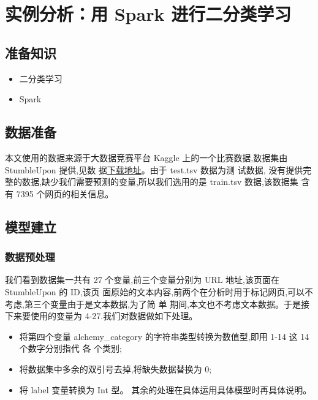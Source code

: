 \section{实例分析：用 Spark
进行二分类学习}\label{ux5b9eux4f8bux5206ux6790ux7528-spark-ux8fdbux884cux4e8cux5206ux7c7bux5b66ux4e60}

\subsection{准备知识}\label{ux51c6ux5907ux77e5ux8bc6}

\begin{itemize}
\itemsep1pt\parskip0pt
\item
  二分类学习
\item
  Spark
\end{itemize}

\subsection{数据准备}\label{ux6570ux636eux51c6ux5907}

本文使用的数据来源于大数据竞赛平台 Kaggle 上的一个比赛数据,数据集由
StumbleUpon 提供,见数
据\href{https://www.kaggle.com/c/stumbleupon/data?train.tsv}{下载地址}。由于
test.tsv 数据为测 试数据,
没有提供完整的数据,缺少我们需要预测的变量,所以我们选用的是 train.tsv
数据,该数据集 含有 7395 个网页的相关信息。

\subsection{模型建立}\label{ux6a21ux578bux5efaux7acb}

\subsubsection{数据预处理}\label{ux6570ux636eux9884ux5904ux7406}

我们看到数据集一共有 27 个变量,前三个变量分别为 URL 地址,该页面在
StumbleUpon 的 ID,该页
面原始的文本内容,前两个在分析时用于标记网页,可以不考虑,第三个变量由于是文本数据,为了简
单 期间,本文也不考虑文本数据。于是接下来要使用的变量为
4-27.我们对数据做如下处理。

\begin{itemize}
\item
  将第四个变量 alchemy\_category 的字符串类型转换为数值型,即用 1-14 这
  14 个数字分别指代 各 个类别;
\item
  将数据集中多余的双引号去掉,将缺失数据替换为 0;
\item
  将 label 变量转换为 Int 型。
  其余的处理在具体运用具体模型时再具体说明。
\end{itemize}

